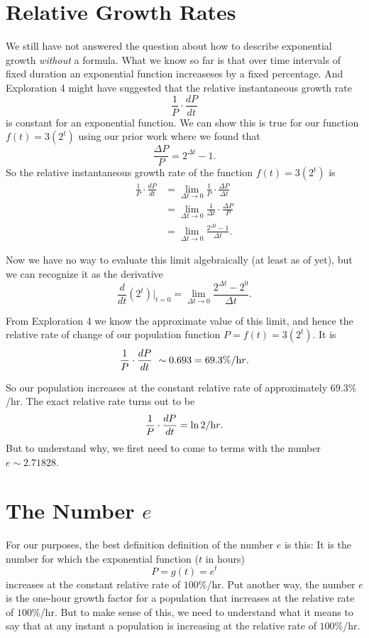 \documentclass{ximera}
\begin{document}
\section{Relative Growth Rates}
We still have not answered the question about how to describe exponential growth \emph{without} a formula. What we know so far is that over time intervals of fixed duration an exponential function increaseses by a fixed percentage.  And Exploration 4 might have suggested that the relative instantaneous growth rate 
\[
  \frac{1}{P}\cdot \frac{dP}{dt}
\]
is constant for an exponential function. We can show this is true for our function $f(t)=3(2^t)$ using our prior work where we found that 
\[
  \frac{\Delta P}{P} = 2^{\Delta t} - 1 .
\]
So the relative instantaneous growth rate of the function $f(t)=3(2^t)$ is 
\begin{align*}
      \frac{1}{P}\cdot \frac{dP}{dt} &= \lim_{\Delta t\to  0} \frac{1}{P} \cdot \frac{\Delta P}{\Delta t} \\
                                                   &= \lim_{\Delta t\to  0} \frac{1}{\Delta t} \cdot \frac{\Delta P}{P} \\
                                                   &=  \lim_{\Delta t\to  0}  \frac{2^{\Delta t} - 1}{\Delta t} .
\end{align*}

Now we have no way to evaluate this limit algebraically (at least as of yet), but we can recognize it as the derivative
\[
     \frac{d}{dt}\left ( 2^ t \right) \Big|_{t=0} = \lim_{\Delta t\to  0}  \frac{2^{\Delta t} - 2^0}{\Delta t} .
\]

From Exploration 4 we know the approximate value of this limit, and hence the relative rate of change of our population function $P = f(t) = 3(2^t)$. It is
\[
        \frac{1}{P}\cdot \frac{dP}{dt} ~\sim 0.693 = 69.3\% / {\text hr}.
\]

So our population increases at the constant relative rate of approximately $69.3\%$/hr. The exact relative rate turns out to be
\[
  \frac{1}{P}\cdot \frac{dP}{dt} = \ln 2 / {\text hr}.
\]
But to understand why, we first need to come to terms with the number $e\sim 2.71828$.


\section{The Number $e$}

For our purposes, the best definition definition of the number $e$ is this: It is the number for which the exponential function ($t$ in hours)
\[
     P = g(t) = e^t 
\]
increases at the constant relative rate of $100\%$/hr. Put another way, the number $e$ is the one-hour growth factor for a population that increases at the relative rate of $100\%$/hr. But to make sense of this, we need to understand what it means to say that at any instant a population is increasing at the relative rate of $100\%$/hr.
\end{document}
